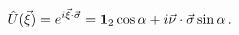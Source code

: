 \begin{equation}\label{SU2} 
\hat U(\vec{\xi})=e^{i\vec{\xi}\cdot\vec{\sigma}}=
{\bf 1}_2 \cos\alpha +i\vec{\nu}\cdot\vec{\sigma}\sin\alpha\,.
\end{equation}

